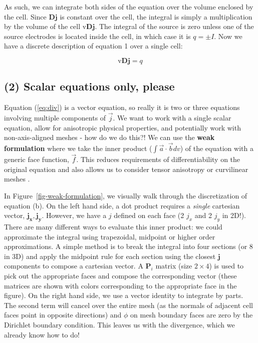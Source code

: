 \documentclass[Journal,InsideFigs,DoubleSpace,12pt,letterpaper]{ascelike-new}
\begin{document}
As such, we can integrate both sides of the equation over the volume enclosed by the cell. Since $\mathbf{D}\mathbf{j}$ is constant over the cell, the integral is simply a multiplication by the volume of the cell $\text{v} \mathbf{D} \mathbf{j}$. The integral of the source is zero unless one of the source electrodes is located inside the cell, in which case it is $q = \pm I$. Now we have a discrete description of equation 1 over a single cell:

\begin{equation}
\label{eq:div}
\text{v} \mathbf{D}\mathbf{j} = q
\end{equation}

\subsection{(2) Scalar equations only, please}\label{(2) Scalar equations only, please}

Equation (\ref{eq:div}) is a vector equation, so really it is two or three equations involving multiple components of $\vec{j}$. We want to work with a single scalar equation, allow for anisotropic physical properties, and potentially work with non-axis-aligned meshes - how do we do this?! We can use the \textbf{weak formulation} where we take the inner product ($\int \vec{a} \cdot \vec{b} dv$) of the equation with a generic face function, $\vec{f}$. This reduces requirements of differentiability on the original equation and also allows us to consider tensor anisotropy or curvilinear meshes .

In Figure~\ref{fig-weak-formulation}, we visually walk through the discretization of equation (b). On the left hand side, a dot product requires a \textit{single} cartesian vector, $\mathbf{j_x, j_y}$. However, we have a $j$ defined on each face (2 $j_x$ and 2 $j_y$ in 2D!). There are many different ways to evaluate this inner product: we could approximate the integral using trapezoidal, midpoint or higher order approximations. A simple method is to break the integral into four sections (or 8 in 3D) and apply the midpoint rule for each section using the closest $\mathbf{j}$ components to compose a cartesian vector. A $\mathbf{P}_i$ matrix (size $2 \times 4$) is used to pick out the appropriate faces and compose the corresponding vector (these matrices are shown with colors corresponding to the appropriate face in the figure). On the right hand side, we use a vector identity to integrate by parts. The second term will cancel over the entire mesh (as the normals of adjacent cell faces point in opposite directions) and $\phi$ on mesh boundary faces are zero by the Dirichlet boundary condition. This leaves us with the divergence, which we already know how to do!
\end{document}
